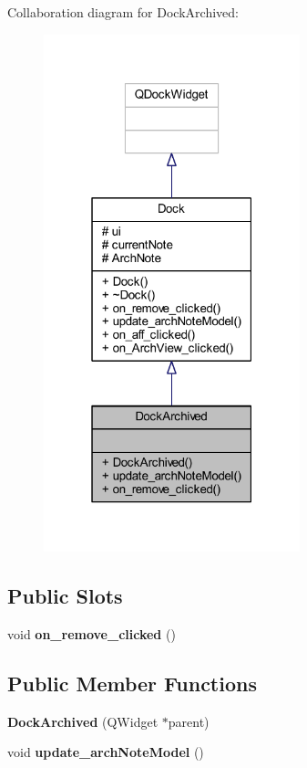 Collaboration diagram for Dock\+Archived\+:\nopagebreak
\begin{figure}[H]
\begin{center}
\leavevmode
\includegraphics[width=211pt]{class_dock_archived__coll__graph}
\end{center}
\end{figure}
\subsection*{Public Slots}
\begin{DoxyCompactItemize}
\item 
\mbox{\label{class_dock_archived_ab2ec83022057fff8169784cf02876a8a}} 
void {\bfseries on\+\_\+remove\+\_\+clicked} ()
\end{DoxyCompactItemize}
\subsection*{Public Member Functions}
\begin{DoxyCompactItemize}
\item 
\mbox{\label{class_dock_archived_ad3cc1b3cbaa84fed8d37c478927c7463}} 
{\bfseries Dock\+Archived} (Q\+Widget $\ast$parent)
\item 
\mbox{\label{class_dock_archived_a557ea9fc3b685f0aefbae0bcd624cbec}} 
void {\bfseries update\+\_\+arch\+Note\+Model} ()
\end{DoxyCompactItemize}
